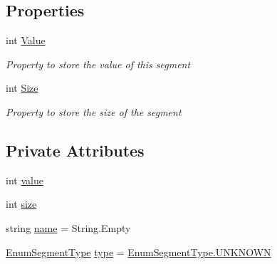 \subsection*{Properties}
\begin{DoxyCompactItemize}
\item 
int \hyperlink{class_c_p_u___o_s___simulator_1_1_compiler_1_1_backend_1_1_instruction_segment_af22d3fe5ffbacd4b521a5638977feaa2}{Value}
\begin{DoxyCompactList}\small\item\em Property to store the value of this segment \end{DoxyCompactList}\item 
int \hyperlink{class_c_p_u___o_s___simulator_1_1_compiler_1_1_backend_1_1_instruction_segment_a7790c585f15f68011143819aa3ccd9e5}{Size}
\begin{DoxyCompactList}\small\item\em Property to store the size of the segment \end{DoxyCompactList}\end{DoxyCompactItemize}
\subsection*{Private Attributes}
\begin{DoxyCompactItemize}
\item 
int \hyperlink{class_c_p_u___o_s___simulator_1_1_compiler_1_1_backend_1_1_instruction_segment_abf6cb46dc29e0e14de6950a188bdd84b}{value}
\item 
int \hyperlink{class_c_p_u___o_s___simulator_1_1_compiler_1_1_backend_1_1_instruction_segment_a99b054d19849ee925c5adb8fb69104a7}{size}
\item 
string \hyperlink{class_c_p_u___o_s___simulator_1_1_compiler_1_1_backend_1_1_instruction_segment_a9ff6a08bc3c5d42ba19e7b6137ff723c}{name} = String.\+Empty
\item 
\hyperlink{namespace_c_p_u___o_s___simulator_1_1_compiler_1_1_backend_a39bd0e4034345155514db8f136c9c639}{Enum\+Segment\+Type} \hyperlink{class_c_p_u___o_s___simulator_1_1_compiler_1_1_backend_1_1_instruction_segment_a7b25026da2449b2ef06fcef42056142c}{type} = \hyperlink{namespace_c_p_u___o_s___simulator_1_1_compiler_1_1_backend_a366a7efa6fcfb05aa404e76da1cf3c5ea696b031073e74bf2cb98e5ef201d4aa3}{Enum\+Segment\+Type.\+U\+N\+K\+N\+O\+W\+N}
\end{DoxyCompactItemize}


